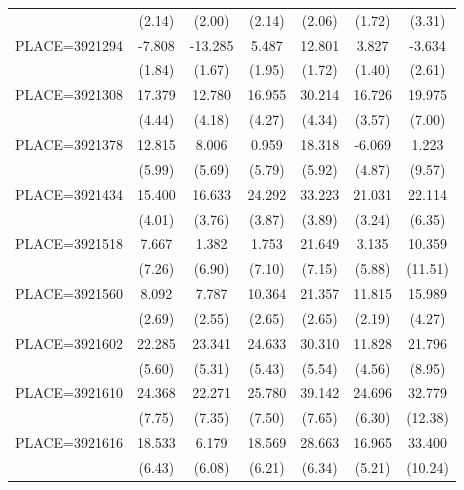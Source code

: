 {\begin{tabular}{l*{6}{c}}
                    &      (2.14)&      (2.00)&      (2.14)&      (2.06)&      (1.72)&      (3.31)\\
PLACE=3921294       &      -7.808&     -13.285&       5.487&      12.801&       3.827&      -3.634\\
                    &      (1.84)&      (1.67)&      (1.95)&      (1.72)&      (1.40)&      (2.61)\\
PLACE=3921308       &      17.379&      12.780&      16.955&      30.214&      16.726&      19.975\\
                    &      (4.44)&      (4.18)&      (4.27)&      (4.34)&      (3.57)&      (7.00)\\
PLACE=3921378       &      12.815&       8.006&       0.959&      18.318&      -6.069&       1.223\\
                    &      (5.99)&      (5.69)&      (5.79)&      (5.92)&      (4.87)&      (9.57)\\
PLACE=3921434       &      15.400&      16.633&      24.292&      33.223&      21.031&      22.114\\
                    &      (4.01)&      (3.76)&      (3.87)&      (3.89)&      (3.24)&      (6.35)\\
PLACE=3921518       &       7.667&       1.382&       1.753&      21.649&       3.135&      10.359\\
                    &      (7.26)&      (6.90)&      (7.10)&      (7.15)&      (5.88)&     (11.51)\\
PLACE=3921560       &       8.092&       7.787&      10.364&      21.357&      11.815&      15.989\\
                    &      (2.69)&      (2.55)&      (2.65)&      (2.65)&      (2.19)&      (4.27)\\
PLACE=3921602       &      22.285&      23.341&      24.633&      30.310&      11.828&      21.796\\
                    &      (5.60)&      (5.31)&      (5.43)&      (5.54)&      (4.56)&      (8.95)\\
PLACE=3921610       &      24.368&      22.271&      25.780&      39.142&      24.696&      32.779\\
                    &      (7.75)&      (7.35)&      (7.50)&      (7.65)&      (6.30)&     (12.38)\\
PLACE=3921616       &      18.533&       6.179&      18.569&      28.663&      16.965&      33.400\\
                    &      (6.43)&      (6.08)&      (6.21)&      (6.34)&      (5.21)&     (10.24)\\

\end{tabular}}
